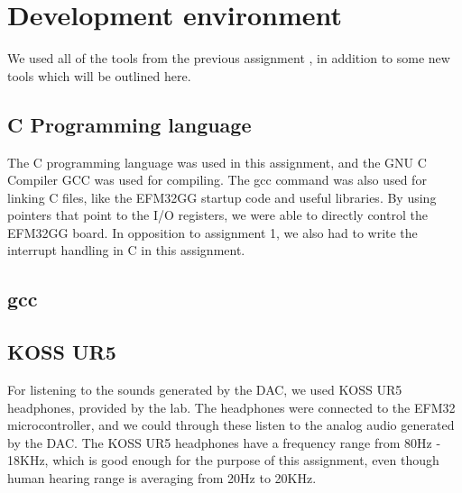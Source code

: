 \section{Development environment}
We used all of the tools from the previous assignment \cite{report-1}, in addition to some new tools which will be outlined here.

\subsection{C Programming language}
The C programming language was used in this assignment, and the GNU C Compiler GCC was used for compiling.
The gcc command was also used for linking C files, like the EFM32GG startup code and useful libraries. By using pointers that point to the I/O registers, we were able to directly control the EFM32GG board. In opposition to assignment 1, we also had to write the interrupt handling in C in this assignment.

\subsection{gcc}

\subsection{KOSS UR5}

For listening to the sounds generated by the DAC, we used KOSS UR5 headphones, provided by the lab. The headphones were connected to the EFM32 microcontroller, and we could through these listen to the analog audio generated by the DAC. The KOSS UR5 headphones have a frequency range from 80Hz - 18KHz, which is good enough for the purpose of this assignment, even though human hearing range is averaging from 20Hz to 20KHz.